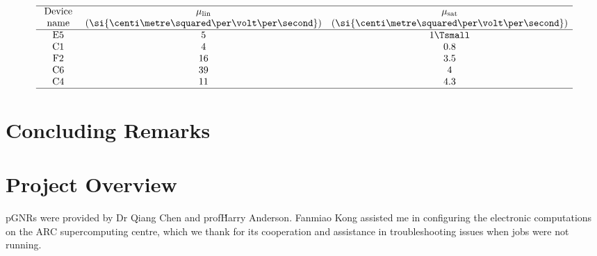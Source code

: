 \begin{table}
    \caption{\label{tab:extracted_mobilities}
        Linear and saturation mobilities extracted from the transfer characteristics of several devices.}
    \[
        \begin{array}{ccc}
            \hline \text { Device } & \mu_{\operatorname{lin}}                        & \mu_{\text{sat}}                                      \\
            \textrm{name}           & (\si{\centi\metre\squared\per\volt\per\second}) & (\si{\centi\metre\squared\per\volt\per\second})       \\
            \hline \text { E5 }     & 5                                               & 1                                             \Tsmall \\
            \text { C1 }            & 4                                               & 0.8                                                   \\
            \text { F2 }            & 16                                              & 3.5                                                   \\
            \text { C6 }            & 39                                              & 4                                                     \\
            \text { C4 }            & 11                                              & 4.3                                                   \\
            \hline
        \end{array}
    \]
\end{table}


\section{Concluding Remarks}\label{gnr-hybrid:sec:summary}


\section{Project Overview}
\Glspl{pGNR} were provided by Dr Qiang Chen and prof\. Harry Anderson. Fanmiao Kong assisted me in configuring the electronic computations on the ARC supercomputing centre, which we thank for its cooperation and assistance in troubleshooting issues when jobs were not running.